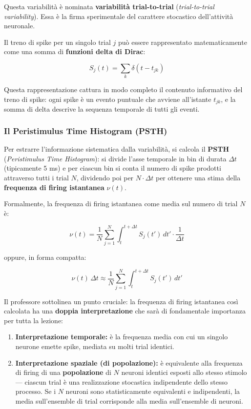 Questa variabilità è nominata \textbf{variabilità trial-to-trial} (\textit{trial-to-trial variability}). Essa è la firma sperimentale del carattere stocastico dell'attività neuronale.

Il treno di spike per un singolo trial $j$ può essere rappresentato matematicamente come una somma di \textbf{funzioni delta di Dirac}:

\begin{equation}
S_j(t) = \sum_{k} \delta(t - t_{jk})
\end{equation}

Questa rappresentazione cattura in modo completo il contenuto informativo del treno di spike: ogni spike è un evento puntuale che avviene all'istante $t_{jk}$, e la somma di delta descrive la sequenza temporale di tutti gli eventi.

\subsubsection{Il Peristimulus Time Histogram (PSTH)}

Per estrarre l'informazione sistematica dalla variabilità, si calcola il \textbf{PSTH} (\textit{Peristimulus Time Histogram}): si divide l'asse temporale in bin di durata $\Delta t$ (tipicamente 5 ms) e per ciascun bin si conta il numero di spike prodotti attraverso tutti i trial $N$, dividendo poi per $N \cdot \Delta t$ per ottenere una stima della \textbf{frequenza di firing istantanea} $\nu(t)$.

Formalmente, la frequenza di firing istantanea come media sul numero di trial $N$ è:

\begin{equation}
\nu(t) = \frac{1}{N} \sum_{j=1}^{N} \int_t^{t+\Delta t} S_j(t') \, dt' \cdot \frac{1}{\Delta t}
\end{equation}

oppure, in forma compatta:

\begin{equation}
\nu(t) \, \Delta t \approx \frac{1}{N} \sum_{j=1}^{N} \int_t^{t+\Delta t} S_j(t') \, dt'
\end{equation}

Il professore sottolinea un punto cruciale: la frequenza di firing istantanea così calcolata ha una \textbf{doppia interpretazione} che sarà di fondamentale importanza per tutta la lezione:

\begin{enumerate}
    \item \textbf{Interpretazione temporale:} è la frequenza media con cui un singolo neurone emette spike, mediata su molti trial identici.
    \item \textbf{Interpretazione spaziale (di popolazione):} è equivalente alla frequenza di firing di una \textbf{popolazione} di $N$ neuroni identici esposti allo stesso stimolo — ciascun trial è una realizzazione stocastica indipendente dello stesso processo. Se i $N$ neuroni sono statisticamente equivalenti e indipendenti, la media sull'ensemble di trial corrisponde alla media sull'ensemble di neuroni.
\end{enumerate}



